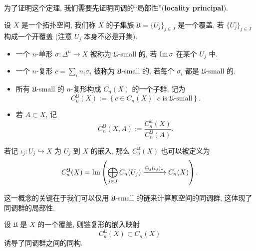         为了证明这个定理, 
        我们需要先证明同调的“局部性”({\bf locality principal}).

        设 $X$ 是一个拓扑空间, 
        我们称 $X$ 的子集族 $\mathfrak{U}=\{U_j\}_{j\in J}$ 是一个覆盖, 
        若 $\{U_j^{\circ}\}_{j\in J}$ 构成一个开覆盖
        (注意 $U_j$ 本身不必是开集).

        \begin{definition}\hfill
            \begin{itemize}
                \item 一个 $n$-单形 $\sigma:\Delta^n\rightarrow X$ 
                被称为 $\mathfrak{U}$-small 的, 
                若 ${\rm Im}\,\sigma$ 在某个 $U_j$ 中.
                \item 一个 $n$-复形 $c=\sum_i{n_i\sigma_i}$ 
                被称为 $\mathfrak{U}$-small 的, 
                若每个 $\sigma_i$ 都是 $\mathfrak{U}$-small 的.
                \item 所有 $\mathfrak{U}$-small 的 $n$-复形构成 
                $C_n(X)$ 的一个子群, 记为
                \begin{equation*}
                    C^{\mathfrak{U}}_n(X):=
                    \left\{c\in C_n(X)\,\big|\,
                    c \text{ is $\mathfrak{U}$-small}\right\}.
                \end{equation*}
                \item 若 $A\subset X$, 记
                \begin{equation*}
                    C^{\mathfrak{U}}_n(X,A)
                    :=\frac{C^{\mathfrak{U}}_n(X)}{C^{\mathfrak{U}}_n(A)}.
                \end{equation*}
            \end{itemize}
        \end{definition}

        若记 $\iota_j:U_j\hookrightarrow X$ 为 $U_j$ 到 $X$ 的嵌入, 那么 $C^{\mathfrak{U}}_n(X)$ 也可以被定义为
        \begin{equation*}
            C^{\mathfrak{U}}_n(X) = {\rm Im}\left(\bigoplus_{j\in J}C_n(U_j)\xrightarrow{\oplus_j (\iota_{j})_*}C_n(X)\right).
        \end{equation*}

        这一概念的关键在于我们可以仅用 $\mathfrak{U}$-small 的链来计算原空间的同调群, 这体现了同调群的局部性.

        \begin{theorem}\label{thm:small-chain}
            设 $\mathfrak{U}$ 是 $X$ 的一个覆盖, 则链复形的嵌入映射
            \begin{equation*}
                C^{\mathfrak{U}}_n(X)\subset C_n(X)
            \end{equation*}
            诱导了同调群之间的同构.
        \end{theorem}

